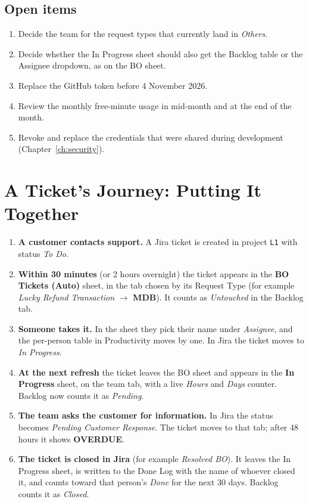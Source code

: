 \documentclass[11pt,a4paper]{article}
\newcommand{\code}[1]{\texttt{#1}}
\newcommand{\tab}[1]{\textbf{#1}}
\let\oldsection\section
\renewcommand{\section}{\needspace{12\baselineskip}\oldsection}
\let\oldsubsection\subsection
\renewcommand{\subsection}{\needspace{7\baselineskip}\oldsubsection}
\begin{document}
\subsection{Open items}
\begin{enumerate}
  \item Decide the team for the request types that currently land in \emph{Others}.
  \item Decide whether the In Progress sheet should also get the Backlog table or the Assignee dropdown,
    as on the BO sheet.
  \item Replace the GitHub token before 4 November 2026.
  \item Review the monthly free-minute usage in mid-month and at the end of the month.
  \item Revoke and replace the credentials that were shared during development (Chapter~\ref{ch:security}).
\end{enumerate}

\section{A Ticket's Journey: Putting It Together}
\begin{enumerate}
  \item \textbf{A customer contacts support.} A Jira ticket is created in project \code{L1} with status \emph{To Do}.
  \item \textbf{Within 30 minutes} (or 2 hours overnight) the ticket appears in the \textbf{BO Tickets (Auto)} sheet, in
    the tab chosen by its Request Type (for example \emph{Lucky Refund Transaction} $\rightarrow$ \tab{MDB}). It counts as
    \emph{Untouched} in the Backlog tab.
  \item \textbf{Someone takes it.} In the sheet they pick their name under \emph{Assignee}, and the per-person table in
    Productivity moves by one. In Jira the ticket moves to \emph{In Progress}.
  \item \textbf{At the next refresh} the ticket leaves the BO sheet and appears in the \textbf{In Progress} sheet, on the
    team tab, with a live \emph{Hours} and \emph{Days} counter. Backlog now counts it as \emph{Pending}.
  \item \textbf{The team asks the customer for information.} In Jira the status becomes \emph{Pending Customer
    Response}. The ticket moves to that tab; after 48 hours it shows \textbf{OVERDUE}.
  \item \textbf{The ticket is closed in Jira} (for example \emph{Resolved BO}). It leaves the In Progress sheet, is
    written to the Done Log with the name of whoever closed it, and counts toward that person's \emph{Done} for the next
    30 days. Backlog counts it as \emph{Closed}.
\end{enumerate}
\end{document}

